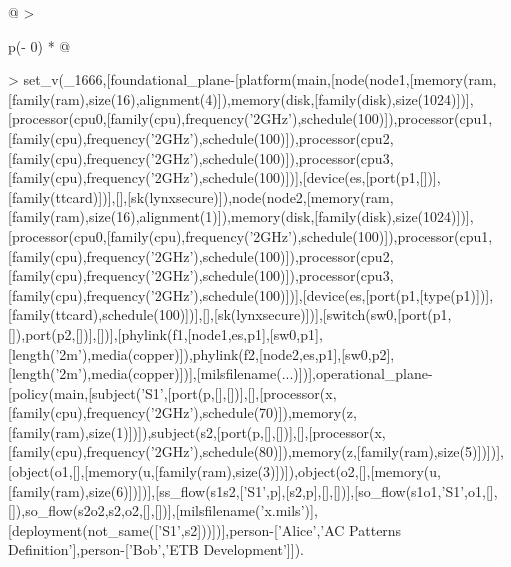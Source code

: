 \documentclass[12pt,twoside,a4paper]{article}
\begin{document}
\begin{longtable}[]{@{}
  >{\raggedright\arraybackslash}p{(\columnwidth - 0\tabcolsep) * }@{}}
\begin{minipage}[b]{\linewidth}
\textgreater{} set\_v(\_1666,{[}foundational\_plane-{[}platform(main,{[}node(node1,{[}memory(ram,{[}family(ram),size(16),alignment(4){]}),memory(disk,{[}family(disk),size(1024){]}){]},{[}processor(cpu0,{[}family(cpu),frequency('2GHz'),schedule(100){]}),processor(cpu1,{[}family(cpu),frequency('2GHz'),schedule(100){]}),processor(cpu2,{[}family(cpu),frequency('2GHz'),schedule(100){]}),processor(cpu3,{[}family(cpu),frequency('2GHz'),schedule(100){]}){]},{[}device(es,{[}port(p1,{[}{]}){]},{[}family(ttcard){]}){]},{[}{]},{[}sk(lynxsecure){]}),node(node2,{[}memory(ram,{[}family(ram),size(16),alignment(1){]}),memory(disk,{[}family(disk),size(1024){]}){]},{[}processor(cpu0,{[}family(cpu),frequency('2GHz'),schedule(100){]}),processor(cpu1,{[}family(cpu),frequency('2GHz'),schedule(100){]}),processor(cpu2,{[}family(cpu),frequency('2GHz'),schedule(100){]}),processor(cpu3,{[}family(cpu),frequency('2GHz'),schedule(100){]}){]},{[}device(es,{[}port(p1,{[}type(p1){]}){]},{[}family(ttcard),schedule(100){]}){]},{[}{]},{[}sk(lynxsecure){]}){]},{[}switch(sw0,{[}port(p1,{[}{]}),port(p2,{[}{]}){]},{[}{]}){]},{[}phylink(f1,{[}node1,es,p1{]},{[}sw0,p1{]},{[}length('2m'),media(copper){]}),phylink(f2,{[}node2,es,p1{]},{[}sw0,p2{]},{[}length('2m'),media(copper){]}){]},{[}milsfilename(...){]}){]},operational\_plane-{[}policy(main,{[}subject('S1',{[}port(p,{[}{]},{[}{]}){]},{[}{]},{[}processor(x,{[}family(cpu),frequency('2GHz'),schedule(70){]}),memory(z,{[}family(ram),size(1){]}){]}),subject(s2,{[}port(p,{[}{]},{[}{]}){]},{[}{]},{[}processor(x,{[}family(cpu),frequency('2GHz'),schedule(80){]}),memory(z,{[}family(ram),size(5){]}){]}){]},{[}object(o1,{[}{]},{[}memory(u,{[}family(ram),size(3){]}){]}),object(o2,{[}{]},{[}memory(u,{[}family(ram),size(6){]}){]}){]},{[}ss\_flow(s1s2,{[}'S1',p{]},{[}s2,p{]},{[}{]},{[}{]}){]},{[}so\_flow(s1o1,'S1',o1,{[}{]},{[}{]}),so\_flow(s2o2,s2,o2,{[}{]},{[}{]}){]},{[}milsfilename('x.mils'){]},{[}deployment(not\_same({[}'S1',s2{]})){]}){]},person-{[}'Alice','AC Patterns Definition'{]},person-{[}'Bob','ETB Development'{]}{]}).


\end{minipage}
\end{longtable}
\end{document}
